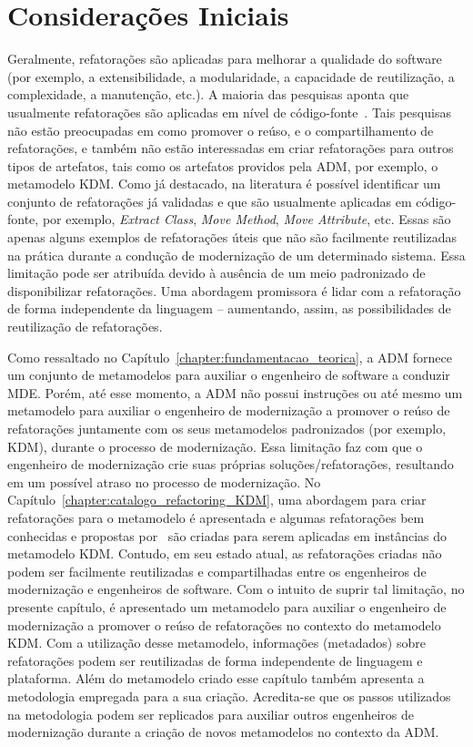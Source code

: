 \section{Considerações Iniciais}\label{sec:consideracoes_iniciais}
Geralmente, refatorações são aplicadas para melhorar a qualidade do software (por exemplo, a extensibilidade, a modularidade, a capacidade de reutilização, a complexidade, a manutenção, etc.). 
A maioria das pesquisas aponta que usualmente refatorações são aplicadas em nível de código-fonte~\cite{Fowler1999, Demeyer1, Demeyer2, OPDYKE_1992}. Tais pesquisas não estão preocupadas em como promover o reúso, e o compartilhamento de refatorações, e também não estão interessadas em criar refatorações para outros tipos de artefatos, tais como os artefatos providos pela ADM, por exemplo, o metamodelo KDM. 
%
Como já destacado, na literatura é possível identificar um conjunto de refatorações já validadas e que são usualmente aplicadas em código-fonte, por exemplo, \textit{Extract Class}, \textit{Move Method}, \textit{Move Attribute}, etc. Essas são apenas alguns exemplos de refatorações úteis que não são facilmente reutilizadas na prática durante a condução de modernização de um determinado sistema. Essa limitação pode ser atribuída devido à ausência de um meio padronizado de disponibilizar refatorações. 
Uma abordagem promissora é lidar com a refatoração de forma independente da linguagem – aumentando, assim, as possibilidades de reutilização de refatorações.

Como ressaltado no Capítulo~\ref{chapter:fundamentacao_teorica}, a ADM fornece um conjunto de metamodelos para auxiliar o engenheiro de software a conduzir MDE. 
Porém, até esse momento, a ADM não possui instruções ou até mesmo um metamodelo para auxiliar o engenheiro de modernização a promover o reúso de refatorações juntamente com os seus metamodelos padronizados (por exemplo, KDM), durante o processo de modernização. 
Essa limitação faz com que o engenheiro de modernização crie suas próprias soluções/refatorações, resultando em um possível atraso no processo de modernização. 
No Capítulo~\ref{chapter:catalogo_refactoring_KDM}, uma abordagem para criar refatorações para o metamodelo é apresentada e algumas refatorações bem conhecidas e propostas por~ são criadas para serem aplicadas em instâncias do metamodelo KDM. Contudo, em seu estado atual, as refatorações criadas não podem ser facilmente reutilizadas e compartilhadas entre os engenheiros de modernização e engenheiros de software. 
Com o intuito de suprir tal limitação, no presente capítulo, é apresentado um metamodelo para auxiliar o engenheiro de modernização a promover o reúso de refatorações no contexto do metamodelo KDM. Com a utilização desse metamodelo, informações (metadados) sobre refatorações podem ser reutilizadas de forma independente de linguagem e plataforma. Além do metamodelo criado esse capítulo também apresenta a metodologia empregada para a sua criação. Acredita-se que os passos utilizados na metodologia podem ser replicados para auxiliar outros engenheiros de modernização durante a criação de novos metamodelos no contexto da ADM.

